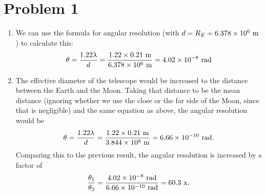 \documentclass[11pt,letterpaper]{article}
\begin{document}
\section*{Problem 1}
\begin{enumerate}[label=(\alph*)]

\item We can use the formula for angular resolution (with $d=R_E=6.378\times 10^{6}~{\rm m}$) to calculate this:
    \begin{align*}
        \theta = \frac{1.22\lambda}{d} = \frac{1.22\times 0.21~{\rm m}}{6.378\times 10^{6}~{\rm m}} = 4.02\times 10^{-8}~{\rm rad}
    \end{align*} 

\item The effective diameter of the telescope would be increased to the distance between the Earth and the Moon. Taking that distance to be the mean distance (ignoring whether we use the close or the far side of the Moon, since that is negligible) and the same equation as above, the angular resolution would be 
    \begin{align*}
        \theta = \frac{1.22\lambda}{d} = \frac{1.22\times 0.21~{\rm m}}{3.844\times 10^{8}~{\rm m}} = 6.66\times 10^{-10}~{\rm rad}.
    \end{align*}
    Comparing this to the previous result, the angular resolution is increased by a factor of 
    \begin{align*}
        \frac{\theta_1}{\theta_2} = \frac{4.02\times 10^{-8}~{\rm rad}}{6.66\times 10^{-10}~{\rm rad}} = 60.3~{\rm x}.
    \end{align*}

\end{enumerate}

\end{document}
